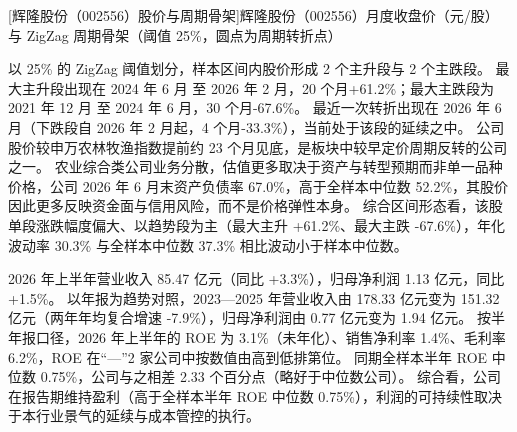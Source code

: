 \begin{center}
\begin{minipage}{\textwidth}\centering
{}

[辉隆股份（002556）股价与周期骨架]{辉隆股份（002556）月度收盘价（元/股）与 ZigZag 周期骨架（阈值 25\%，圆点为周期转折点）}
\end{minipage}
\end{center}

 以 25\% 的 ZigZag 阈值划分，样本区间内股价形成 2 个主升段与 2 个主跌段。 最大主升段出现在 2024 年 6 月 至 2026 年 2 月，20 个月+61.2\%；最大主跌段为 2021 年 12 月 至 2024 年 6 月，30 个月-67.6\%。 最近一次转折出现在 2026 年 6 月（下跌段自 2026 年 2 月起，4 个月-33.3\%），当前处于该段的延续之中。 公司股价较申万农林牧渔指数提前约 23 个月见底，是板块中较早定价周期反转的公司之一。 农业综合类公司业务分散，估值更多取决于资产与转型预期而非单一品种价格，公司 2026 年 6 月末资产负债率 67.0\%，高于全样本中位数 52.2\%，其股价因此更多反映资金面与信用风险，而不是价格弹性本身。 综合区间形态看，该股单段涨跌幅度偏大、以趋势段为主（最大主升 +61.2\%、最大主跌 -67.6\%），年化波动率 30.3\% 与全样本中位数 37.3\% 相比波动小于样本中位数。

 2026 年上半年营业收入 85.47 亿元（同比 +3.3\%），归母净利润 1.13 亿元，同比 +1.5\%。 以年报为趋势对照，2023---2025 年营业收入由 178.33 亿元变为 151.32 亿元（两年年均复合增速 -7.9\%），归母净利润由 0.77 亿元变为 1.94 亿元。 按半年报口径，2026 年上半年的 ROE 为 3.1\%（未年化）、销售净利率 1.4\%、毛利率 6.2\%，ROE 在“—”2 家公司中按数值由高到低排第位。 同期全样本半年 ROE 中位数 0.75\%，公司与之相差 2.33 个百分点（略好于中位数公司）。 综合看，公司在报告期维持盈利（高于全样本半年 ROE 中位数 0.75\%），利润的可持续性取决于本行业景气的延续与成本管控的执行。

